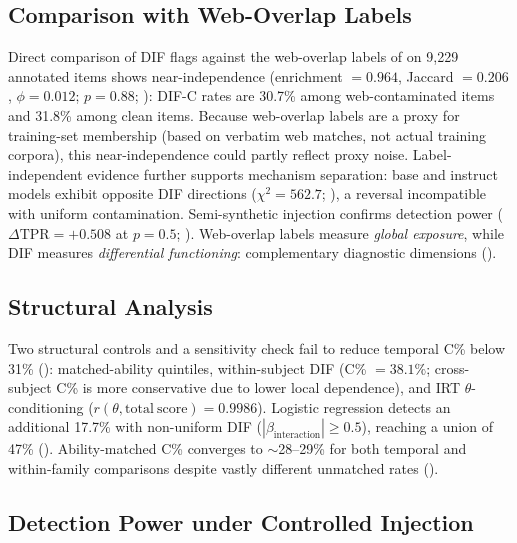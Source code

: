 \subsection{Comparison with Web-Overlap Labels}
\label{sec:groundtruth}

Direct comparison of DIF flags against the web-overlap labels of \citet{li2024contamination} on 9,229 annotated items shows near-independence (enrichment $= 0.964$, Jaccard $= 0.206$, $\phi = 0.012$; $p = 0.88$; ): DIF-C rates are 30.7\% among web-contaminated items and 31.8\% among clean items. Because web-overlap labels are a proxy for training-set membership (based on verbatim web matches, not actual training corpora), this near-independence could partly reflect proxy noise. Label-independent evidence further supports mechanism separation: base and instruct models exhibit opposite DIF directions ($\chi^2 = 562.7$; ), a reversal incompatible with uniform contamination. Semi-synthetic injection confirms detection power ($\Delta\mathrm{TPR} = {+}0.508$ at $p = 0.5$; ). Web-overlap labels measure \emph{global exposure}, while DIF measures \emph{differential functioning}: complementary diagnostic dimensions ().

\subsection{Structural Analysis}
\label{sec:structural}

Two structural controls and a sensitivity check fail to reduce temporal C\% below 31\% (): matched-ability quintiles, within-subject DIF (C\% $= 38.1\%$; cross-subject C\% is more conservative due to lower local dependence), and IRT $\theta$-conditioning ($r(\theta, \mathrm{total\ score}) = 0.9986$). Logistic regression detects an additional 17.7\% with non-uniform DIF ($|\beta_{\mathrm{interaction}}| \geq 0.5$), reaching a union of 47\% (). Ability-matched C\% converges to ${\sim}$28--29\% for both temporal and within-family comparisons despite vastly different unmatched rates ().

\subsection{Detection Power under Controlled Injection}
\label{sec:semisynthetic}

